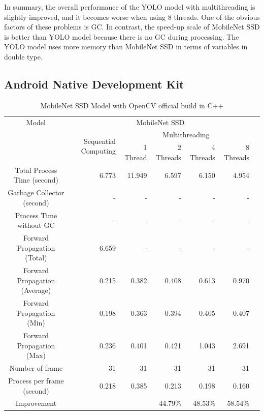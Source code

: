             In summary, the overall performance of the YOLO model with multithreading is slightly improved,
            and it becomes worse when using 8 threads.
            One of the obvious factors of these problems is
            GC.
            In contrast, the speed-up scale of MobileNet SSD is better than YOLO model because there is no
            GC during processing.
            The YOLO model uses more memory than MobileNet SSD in terms of variables in double type.

        \subsection{Android Native Development Kit}

            \begin{table}[!htp]\centering
                \scriptsize
                \begin{tabular}{lrrrrrrr}\toprule
                    \multicolumn{2}{c}{Model} &\multicolumn{5}{c}{MobileNet SSD} \\\cmidrule{1-7}
                    \multicolumn{2}{c}{\multirow{2}{*}{}} &\multirow{2}{*}{Sequential Computing} &\multicolumn{4}{c}{Multithreading} \\\cmidrule{4-7}
                    & & &1 Thread &2 Threads &4 Threads &8 Threads \\\midrule
                    \multicolumn{2}{c}{Total Process Time (second)} &6.773 &11.949 &6.597 &6.150 &4.954 \\
                    \multicolumn{2}{c}{Garbage Collector (second)} &- &- &- &- &- \\
                    \multicolumn{2}{c}{Process Time without GC} &- &- &- &- &- \\
                    \multicolumn{2}{c}{Forward Propagation (Total)} &6.659 &- &- &- &- \\
                    \multicolumn{2}{c}{Forward Propagation (Average)} &0.215 &0.382 &0.408 &0.613 &0.970 \\
                    \multicolumn{2}{c}{Forward Propagation (Min)} &0.198 &0.363 &0.394 &0.405 &0.407 \\
                    \multicolumn{2}{c}{Forward Propagation (Max)} &0.236 &0.401 &0.421 &1.043 &2.691 \\
                    \multicolumn{2}{c}{Number of frame} &31 &31 &31 &31 &31 \\
                    \multicolumn{2}{c}{Process per frame (second)} &0.218 &0.385 &0.213 &0.198 &0.160 \\
                    \multicolumn{2}{c}{Improvement} & & &44.79\% &48.53\% &58.54\% \\
                    \bottomrule
                \end{tabular}

                \caption{MobileNet SSD Model with OpenCV official build in C++}\label{ssd:official-performace-cpp}
            \end{table}

